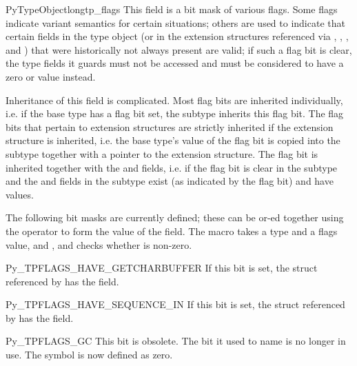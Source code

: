 \begin{cmemberdesc}{PyTypeObject}{long}{tp_flags}
  This field is a bit mask of various flags.  Some flags indicate
  variant semantics for certain situations; others are used to
  indicate that certain fields in the type object (or in the extension
  structures referenced via ,
  , , and
  ) that were historically not always present are
  valid; if such a flag bit is clear, the type fields it guards must
  not be accessed and must be considered to have a zero or \NULL{}
  value instead.

  Inheritance of this field is complicated.  Most flag bits are
  inherited individually, i.e. if the base type has a flag bit set,
  the subtype inherits this flag bit.  The flag bits that pertain to
  extension structures are strictly inherited if the extension
  structure is inherited, i.e. the base type's value of the flag bit
  is copied into the subtype together with a pointer to the extension
  structure.  The  flag bit is inherited
  together with the  and  fields,
  i.e. if the  flag bit is clear in the
  subtype and the  and  fields in
  the subtype exist (as indicated by the
   flag bit) and have \NULL{}
  values.

  The following bit masks are currently defined; these can be or-ed
  together using the \code{|} operator to form the value of the
   field.  The macro 
  takes a type and a flags value,  and , and checks
  whether  is non-zero.

  \begin{datadesc}{Py_TPFLAGS_HAVE_GETCHARBUFFER}
    If this bit is set, the  struct referenced by
     has the  field.
  \end{datadesc}

  \begin{datadesc}{Py_TPFLAGS_HAVE_SEQUENCE_IN}
    If this bit is set, the  struct
    referenced by  has the 
    field.
  \end{datadesc}

  \begin{datadesc}{Py_TPFLAGS_GC}
    This bit is obsolete.  The bit it used to name is no longer in
    use.  The symbol is now defined as zero.
  \end{datadesc}


\end{cmemberdesc}
